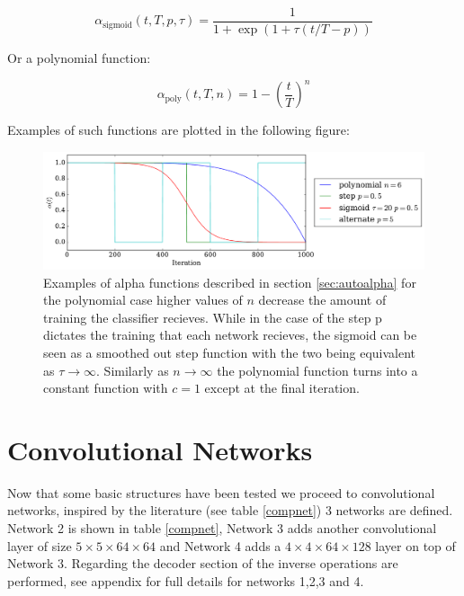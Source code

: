     \begin{equation}
      \alpha_{\text{sigmoid}}(t,T,p,\tau) = \frac{1}{1 + \exp(1 + \tau (t/T - p))}
    \end{equation}

    Or a polynomial function:

    \begin{equation}
      \alpha_{\text{poly}}(t,T,n) = 1 - \left ( \frac{t}{T} \right )^n
    \end{equation}

    Examples of such functions are plotted in the following figure:

    \begin{figure}[!h]
    \centering
    \includegraphics[width =\hsize]{figures/alpha.pdf}
    \caption{Examples of alpha functions described in section \ref{sec:autoalpha}
    for the polynomial case higher values of $n$ decrease the amount of training
    the classifier recieves. While in the case of the step p dictates the training
    that each network recieves, the sigmoid can be seen as a smoothed out step function
    with the two being equivalent as $ \tau \rightarrow \infty$. Similarly as $n \rightarrow \infty$
    the polynomial function turns into a constant function with $c=1$ except at the final
    iteration.}
    \label{fig:alpha_functions}
    \end{figure}


  \section{Convolutional Networks}

    Now that some basic structures have been tested we proceed to convolutional networks,
    inspired by the literature (see table \ref{compnet}) 3 networks are defined. Network 2 is shown in table \ref{compnet}, Network 3
    adds another convolutional layer of size $5\times 5 \times 64 \times 64$ and Network 4 adds a $4\times 4 \times 64 \times 128$ layer
    on top of Network 3. Regarding the decoder section of the inverse operations are performed, see appendix \label{appendix1} for full details
    for networks 1,2,3 and 4.

